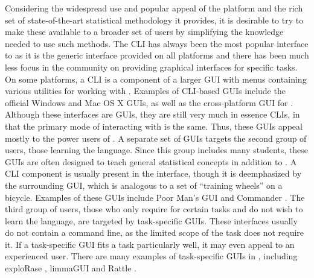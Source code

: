 \documentclass[article,shortnames]{jss}
\begin{document}
Considering the widespread use and popular appeal of the 
platform and the rich set of state-of-the-art statistical methodology
it provides, it is desirable to try to make these available to a
broader set of users by simplifying the knowledge needed to use such
methods.
The CLI has always been the most popular interface to  as it is the generic interface provided on all platforms and there has been much less focus in the  community on providing graphical interfaces for specific tasks.  On some platforms, a CLI is a component of a larger GUI with menus containing various utilities for working with . Examples of CLI-based  GUIs include the official Windows and Mac OS X GUIs, as well as the cross-platform  GUI for  \citep[,][]{JGR}.  Although these interfaces are GUIs, they are still very much in essence CLIs, in that the primary mode of interacting with  is the same. Thus, these GUIs appeal mostly to the power users of .  A separate set of GUIs targets the second group of users, those learning the  language. Since this group includes many students, these GUIs are often designed to teach general statistical concepts in addition to .  A CLI component is usually present in the interface, though it is deemphasized by the surrounding GUI, which is analogous to a set of ``training wheels'' on a bicycle. Examples of these GUIs include Poor Man's GUI \citep[,][]{pmg} and  Commander \citep{rcmndr}. The third group of users, those who only require  for certain tasks and do not wish to learn the language, are targeted by task-specific GUIs. These interfaces usually do not contain a command line, as the limited scope of the task does not require it. If a task-specific GUI fits a task particularly well, it may even appeal to an experienced user. There are many examples of task-specific GUIs in , including exploRase \citep{explorase}, limmaGUI \citep{limma} and Rattle \citep{rattle}.
\end{document}
